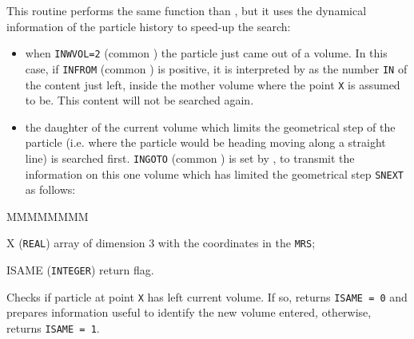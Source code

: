 This routine performs the same function than , but it uses
the dynamical information of the particle history to speed-up the 
search:
\begin{itemize}
\item when {\tt INWVOL=2} (common )
the particle just came out of a volume. In this
case, if {\tt INFROM} (common ) is positive, it is
interpreted by  as the number {\tt IN} of the content
just left, inside the mother volume
where the point {\tt X} is assumed to be. This content will not be
searched again.
\item the daughter of the current volume which limits the
geometrical step of the particle (i.e. where the particle would be heading
moving along a straight line) is searched first.
{\tt INGOTO} (common ) is set by , to transmit 
the information
on this one volume which has limited the geometrical step {\tt SNEXT} as follows:
\end{itemize}

\begin{DLtt}{MMMMMMMM}
\item[X] ({\tt REAL}) array of dimension 3 with the coordinates in the 
{\tt MRS};
\item[ISAME] ({\tt INTEGER}) return flag.
\end{DLtt}
Checks if particle at point {\tt X} has left current volume.
If so, returns {\tt ISAME = 0} and prepares information useful to
identify the new volume entered, otherwise, returns {\tt ISAME = 1}.
